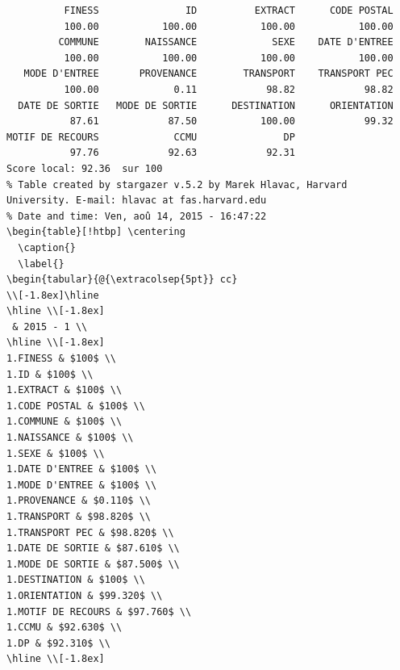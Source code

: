 \documentclass[]{article}
\begin{document}
\begin{verbatim}
          FINESS               ID          EXTRACT      CODE POSTAL 
          100.00           100.00           100.00           100.00 
         COMMUNE        NAISSANCE             SEXE    DATE D'ENTREE 
          100.00           100.00           100.00           100.00 
   MODE D'ENTREE       PROVENANCE        TRANSPORT    TRANSPORT PEC 
          100.00             0.11            98.82            98.82 
  DATE DE SORTIE   MODE DE SORTIE      DESTINATION      ORIENTATION 
           87.61            87.50           100.00            99.32 
MOTIF DE RECOURS             CCMU               DP 
           97.76            92.63            92.31 
Score local: 92.36  sur 100
% Table created by stargazer v.5.2 by Marek Hlavac, Harvard University. E-mail: hlavac at fas.harvard.edu
% Date and time: Ven, aoû 14, 2015 - 16:47:22
\begin{table}[!htbp] \centering 
  \caption{} 
  \label{} 
\begin{tabular}{@{\extracolsep{5pt}} cc} 
\\[-1.8ex]\hline 
\hline \\[-1.8ex] 
 & 2015 - 1 \\ 
\hline \\[-1.8ex] 
1.FINESS & $100$ \\ 
1.ID & $100$ \\ 
1.EXTRACT & $100$ \\ 
1.CODE POSTAL & $100$ \\ 
1.COMMUNE & $100$ \\ 
1.NAISSANCE & $100$ \\ 
1.SEXE & $100$ \\ 
1.DATE D'ENTREE & $100$ \\ 
1.MODE D'ENTREE & $100$ \\ 
1.PROVENANCE & $0.110$ \\ 
1.TRANSPORT & $98.820$ \\ 
1.TRANSPORT PEC & $98.820$ \\ 
1.DATE DE SORTIE & $87.610$ \\ 
1.MODE DE SORTIE & $87.500$ \\ 
1.DESTINATION & $100$ \\ 
1.ORIENTATION & $99.320$ \\ 
1.MOTIF DE RECOURS & $97.760$ \\ 
1.CCMU & $92.630$ \\ 
1.DP & $92.310$ \\ 
\hline \\[-1.8ex] 

\end{verbatim}
\end{document}
